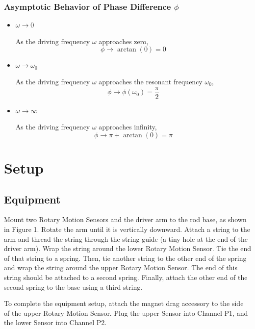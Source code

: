 \subsubsection{Asymptotic Behavior of Phase Difference $\phi$}
\begin{itemize}
	\item $\omega \to 0$
		
		As the driving frequency $\omega$ approaches zero,
		\begin{equation}
		\phi \to \arctan(0) = 0
		\end{equation}
	
	\item $\omega \to \omega_0$
	
	As the driving frequency $\omega$ approaches the resonant frequency $\omega_0,$
	\begin{equation}
	\phi \to \phi(\omega_0)=\frac\pi 2
	\end{equation}
	
	\item $\omega \to \infty$
	
	As the driving frequency $\omega$ approaches infinity,
	\begin{equation}
	\phi \to \pi+\arctan(0)=\pi
	\end{equation}
	
	
\end{itemize}

\section{Setup}
\subsection{Equipment}
Mount two Rotary Motion Sensors and the driver arm to the rod base, as shown in Figure 1. Rotate the arm until it is vertically downward. Attach a string to the arm and thread the string through the string guide (a tiny hole at the end of the driver arm). Wrap the string around the lower Rotary Motion Sensor. Tie the end of that string to a spring. Then, tie another string to the other end of the spring and wrap the string around the upper Rotary Motion Sensor. The end of this string should be attached to a second spring. Finally, attach the other end of the second spring to the base using a third string.

To complete the equipment setup, attach the magnet drag accessory to the side of the upper Rotary Motion Sensor. Plug the upper Sensor into Channel P1, and the lower Sensor into Channel P2.

